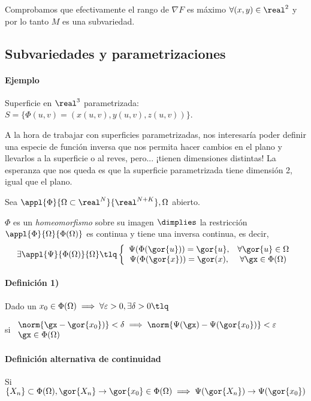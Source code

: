 Comprobamos que efectivamente el rango de $\nabla F$ es máximo $\forall (x,y)\in \real^2$ y por lo tanto $M$ es una subvariedad.

\subsection{Subvariedades y parametrizaciones}
\paragraph{Ejemplo} Superficie en $\real^3$ parametrizada: $S = \{\Phi(u,v) = (x(u,v),y(u,v),z(u,v))\}$.

A la hora de trabajar con superficies parametrizadas, nos interesaría poder definir una especie de función inversa que nos permita hacer cambios en el plano y llevarlos a la superficie o al reves, pero... ¡tienen dimensiones distintas! La esperanza que nos queda es que la superficie parametrizada tiene dimensión 2, igual que el plano.

\begin{defn}[Homeomorfismo]
Sea $\appl{\Phi}{\Omega\subset\real^N}{\real^{N+K}}, \Omega$ abierto.

$\Phi$ es un \emph{homeomorfismo} sobre su imagen $\dimplies $ la restricción $\appl{\Phi}{\Omega}{\Phi(\Omega)}$ es continua y tiene una inversa continua,
es decir, \[\exists \appl{\Psi}{\Phi(\Omega)}{\Omega} \tlq 
\left\{ \begin{array}{cc} 
\Psi(\Phi(\gor{u})) = \gor{u}, &\forall \gor{u} \in \Omega\\ 
\Psi(\Phi(\gor{x})) = \gor(x), &\forall \gx \in \Phi(\Omega)
\end{array}\right.\]

\paragraph{Definición 1)}
Dado un $\displaystyle x_0 \in \Phi(\Omega) \implies \forall \varepsilon >0, \exists \delta>0 \tlq$ 

si $\begin{array}{lc}
\norm{\gx-\gor{x_0})} < \delta \implies \norm{\Psi(\gx)-\Psi(\gor{x_0})}<\varepsilon\\
\gx \in \Phi(\Omega)
\end{array}$

\paragraph{Definición alternativa de continuidad}
Si $\{X_n\}\subset\Phi(\Omega), \gor{X_n} \rightarrow \gor{x_0}\in\Phi(\Omega) \implies \Psi(\gor{X_n}) \rightarrow \Psi(\gor{x_0})$

\end{defn}

